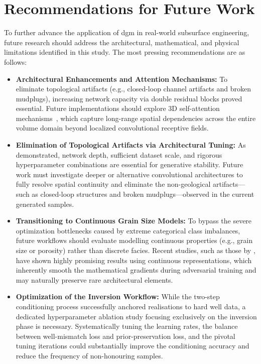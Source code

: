 \section{Recommendations for Future Work}\label{Sec:Recommendations}
To further advance the application of \gls{dgm} in real-world subsurface engineering, future research should address the architectural, mathematical, and physical limitations identified in this study. The most pressing recommendations are as follows:

\begin{itemize}
    \item \textbf{Architectural Enhancements and Attention Mechanisms:} To eliminate topological artifacts (e.g., closed-loop channel artifacts and broken mudplugs), increasing network capacity via double residual blocks proved essential. Future implementations should explore 3D self-attention mechanisms~\parencite{brock2018large}, which capture long-range spatial dependencies across the entire volume domain beyond localized convolutional receptive fields.

    \item \textbf{Elimination of Topological Artifacts via Architectural Tuning:} As demonstrated, network depth, sufficient dataset scale, and rigorous hyperparameter combinations are essential for generative stability. Future work must investigate deeper or alternative convolutional architectures to fully resolve spatial continuity and eliminate the non-geological artifacts—such as closed-loop structures and broken mudplugs—observed in the current generated samples.
    
    \item \textbf{Transitioning to Continuous Grain Size Models:} To bypass the severe optimization bottlenecks caused by extreme categorical class imbalances, future workflows should evaluate modelling continuous properties (e.g., grain size or porosity) rather than discrete facies. Recent studies, such as those by \textcite{rongier2025atowards}, have shown highly promising results using continuous representations, which inherently smooth the mathematical gradients during adversarial training and may naturally preserve rare architectural elements.
    
    \item \textbf{Optimization of the Inversion Workflow:} While the two-step conditioning process successfully anchored realisations to hard well data, a dedicated hyperparameter ablation study focusing exclusively on the inversion phase is necessary. Systematically tuning the learning rates, the balance between well-mismatch loss and prior-preservation loss, and the pivotal tuning iterations could substantially improve the conditioning accuracy and reduce the frequency of non-honouring samples.
    

\end{itemize}
